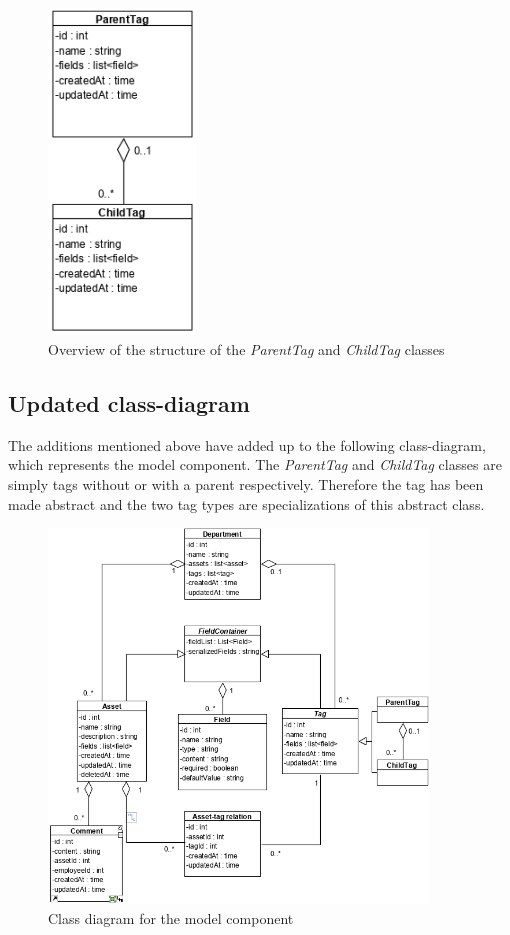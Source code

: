 \begin{figure}[H]
    \centering
    \includegraphics[width=0.35\textwidth]{figures/Structures/TagHierarchy.png}
    \caption{Overview of the structure of the \textit{ParentTag} and \textit{ChildTag} classes}
    \label{fig:TagHierarchy}
\end{figure}

\subsection{Updated class-diagram}
The additions mentioned above have added up to the following class-diagram, which represents the model component. The \textit{ParentTag} and \textit{ChildTag} classes are simply tags without or with a parent respectively. Therefore the tag has been made abstract and the two tag types are specializations of this abstract class.

\begin{figure}[H]
    \centering
    \includegraphics[width=0.9\textwidth]{figures/ClassDiagrams/ModelComponentClassDiagram.png}
    \caption{Class diagram for the model component}
    \label{fig:ModelComponentClassDiagram}
\end{figure}

